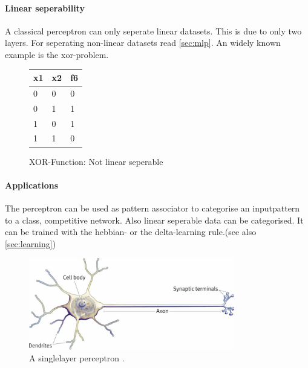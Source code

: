 \documentclass[10pt,a4paper,DIV=11]{scrreprt}
\begin{document}
\paragraph{Linear seperability}
A classical perceptron can only seperate linear datasets. This is due to only two layers. For seperating non-linear datasets read \ref{sec:mlp}.
An widely known example is the xor-problem.

\begin{figure}[H]
	\centering
\begin{tabular}{|l|l|l|}
	\hline
	x1 & x2 & f6\\
	\hline
	0 & 0 & 0 \\
	\hline
	0 & 1 & 1 \\
	\hline
	1 & 0 & 1 \\
	\hline
	1 & 1 & 0 \\
	\hline
\end{tabular}
	\caption{XOR-Function: Not linear seperable}
	\label{fig:linsep1}
	
		
\end{figure}

\paragraph{Applications}
The perceptron can be used as pattern associator to categorise an inputpattern to a class, competitive network. Also linear seperable data can be categorised.
It can be trained with the hebbian- or the delta-learning rule.(see also \eqref{sec:learning})

\begin{center}
	\begin{figure}[H]
		\centering
		\includegraphics[width=0.8\textwidth,scale=1]{files/neuron.jpg}  
		\caption{A singlelayer perceptron \cite{PERSIN}.}
		\label{fig:neuron}
	\end{figure}
\end{center}
\end{document}
